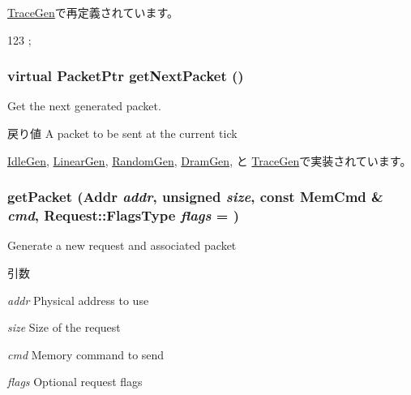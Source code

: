 \hyperlink{classTraceGen_a358d2e2397ca11ccd17553e3c40e7901}{TraceGen}で再定義されています。


\begin{DoxyCode}
123 { };
\end{DoxyCode}
\hypertarget{classBaseGen_a6cdb7c977e91dfc33aeea10a3dfcefed}{
\subsubsection[{getNextPacket}]{\setlength{\rightskip}{0pt plus 5cm}virtual {\bf PacketPtr} getNextPacket ()}}
\label{classBaseGen_a6cdb7c977e91dfc33aeea10a3dfcefed}
Get the next generated packet.

\begin{DoxyReturn}{戻り値}
A packet to be sent at the current tick 
\end{DoxyReturn}


\hyperlink{classIdleGen_a938aa9841a9a62a776afbd0768af5379}{IdleGen}, \hyperlink{classLinearGen_a938aa9841a9a62a776afbd0768af5379}{LinearGen}, \hyperlink{classRandomGen_a938aa9841a9a62a776afbd0768af5379}{RandomGen}, \hyperlink{classDramGen_a938aa9841a9a62a776afbd0768af5379}{DramGen}, と \hyperlink{classTraceGen_a938aa9841a9a62a776afbd0768af5379}{TraceGen}で実装されています。\hypertarget{classBaseGen_ae4f945239fa7bde755f55122f661f467}{
\subsubsection[{getPacket}]{ getPacket ({\bf Addr} {\em addr}, \/  unsigned {\em size}, \/  const {\bf MemCmd} \& {\em cmd}, \/  {\bf Request::FlagsType} {\em flags} = {})}}
\label{classBaseGen_ae4f945239fa7bde755f55122f661f467}
Generate a new request and associated packet


\begin{DoxyParams}{引数}
\item[{\em addr}]Physical address to use \item[{\em size}]Size of the request \item[{\em cmd}]Memory command to send \item[{\em flags}]Optional request flags \end{DoxyParams}



